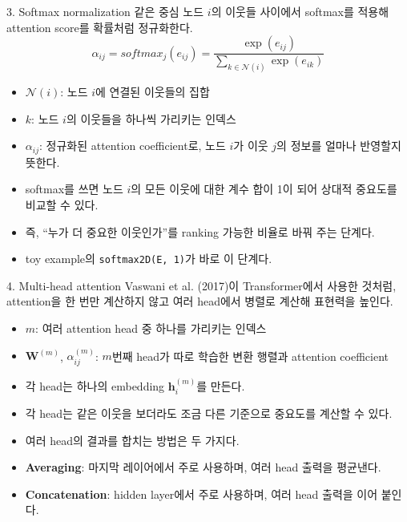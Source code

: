 \begin{frame}{3. Softmax normalization}
\small
같은 중심 노드 $i$의 이웃들 사이에서 softmax를 적용해 attention score를 확률처럼 정규화한다.
\[
\alpha_{ij} = softmax_j(e_{ij}) = \frac{\exp(e_{ij})}{\sum_{k\in\mathcal{N}(i)}\exp(e_{ik})}
\]
\vspace{0.3em}
\begin{itemize}
  \item $\mathcal{N}(i)$: 노드 $i$에 연결된 이웃들의 집합
  \item $k$: 노드 $i$의 이웃들을 하나씩 가리키는 인덱스
  \item $\alpha_{ij}$: 정규화된 attention coefficient로, 노드 $i$가 이웃 $j$의 정보를 얼마나 반영할지 뜻한다.
  \item softmax를 쓰면 노드 $i$의 모든 이웃에 대한 계수 합이 1이 되어 상대적 중요도를 비교할 수 있다.
  \item 즉, ``누가 더 중요한 이웃인가''를 ranking 가능한 비율로 바꿔 주는 단계다.
  \item toy example의 \texttt{softmax2D(E, 1)}가 바로 이 단계다.
\end{itemize}
\end{frame}

\begin{frame}{4. Multi-head attention}
\small
Vaswani et al. (2017)이 Transformer에서 사용한 것처럼, attention을 한 번만 계산하지 않고 여러 head에서 병렬로 계산해 표현력을 높인다.
\vspace{0.3em}
\begin{itemize}
  \item $m$: 여러 attention head 중 하나를 가리키는 인덱스
  \item $\mathbf{W}^{(m)}$, $\alpha_{ij}^{(m)}$: $m$번째 head가 따로 학습한 변환 행렬과 attention coefficient
  \item 각 head는 하나의 embedding $\mathbf{h}_i^{(m)}$를 만든다.
  \item 각 head는 같은 이웃을 보더라도 조금 다른 기준으로 중요도를 계산할 수 있다.
  \item 여러 head의 결과를 합치는 방법은 두 가지다.
  \item \textbf{Averaging}: 마지막 레이어에서 주로 사용하며, 여러 head 출력을 평균낸다.
  \item \textbf{Concatenation}: hidden layer에서 주로 사용하며, 여러 head 출력을 이어 붙인다.
\end{itemize}
\end{frame}

